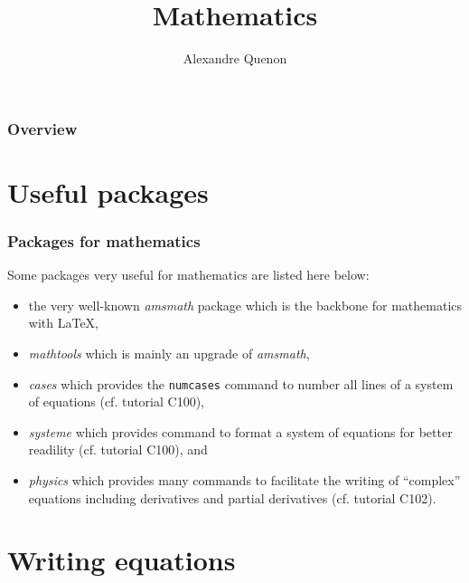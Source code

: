 \documentclass[11pt]{beamer}
\title{Mathematics}
\author[A. Quenon]{Alexandre Quenon}
\begin{document}
\begin{frame}
	\titlepage
\end{frame}


\begin{frame}
	\frametitle{Overview}
	
	\tableofcontents
\end{frame}


\section{Useful packages}

\begin{frame}
	\frametitle{Packages for mathematics}

	Some packages very useful for mathematics are listed here below:
	\begin{itemize}
		\item the very well-known \emph{amsmath} package which is the backbone for mathematics with \LaTeX{},
		\item \alert{\emph{mathtools}} which is mainly an upgrade of \emph{amsmath},
		\item \emph{cases} which provides the \texttt{numcases} command to number all lines of a system of equations (cf. tutorial C100),
		\item \emph{systeme} which provides command to format a system of equations for better readility (cf. tutorial C100), and
		\item \emph{physics} which provides many commands to facilitate the writing of \enquote{complex} equations including derivatives and partial derivatives (cf. tutorial C102).
	\end{itemize}
\end{frame}


\section{Writing equations}
\end{document}
